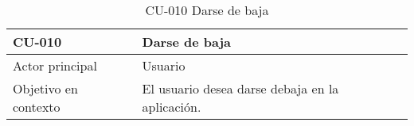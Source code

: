 \begin{table}[htpb]
\centering
\caption{CU-010 Darse de baja}                                                                                                                                                                                                                                                                                                                                                                                                                                                                                                                                                                                                  
\begin{tabularx}{\textwidth}{|X|X|}
\hline
CU-010                            & Darse de baja                                                                                                                                                                                                                                                                                                                                                                                                                                                                                                                                                                                                   \\ \hline
Actor principal                   & Usuario                                                                                                                                                                                                                                                                                                                                                                                                                                                                                                                                                                                                         \\ \hline
Objetivo en contexto              & El usuario desea darse debaja en la aplicación.                                                                                                                                                                                                                                                                                                                                                                                                                                                                                                                                                                 \\ \hline

\end{tabularx}
\end{table}

